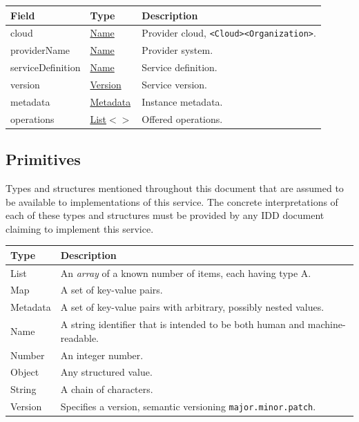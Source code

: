 \documentclass[a4paper]{arrowhead}
\newcommand{\pdef}[1]{{\textcolor{ArrowheadGrey}{#1\label{sec:model:primitives:#1}\label{sec:model:primitives:#1s}\label{sec:model:primitives:#1es}}}}
\newcommand{\pref}[1]{{\textcolor{ArrowheadGrey}{\hyperref[sec:model:primitives:#1]{#1}}}}
\begin{document}
\noindent\begin{tabularx}{\textwidth}{| >{\raggedright\arraybackslash}p{3.9cm} | >{\raggedright\arraybackslash\small}p{5.3cm} | X |} \hline
\rowcolor{gray!33} Field & Type & Description \\ \hline
cloud & \pref{Name} & Provider cloud, \texttt{\textless{}Cloud\textgreater{}\textbar{}\allowbreak{}\textless{}Organization\textgreater{}}. \\ \hline
provider\allowbreak{}Name & \pref{Name} & Provider system. \\ \hline
service\allowbreak{}Definition & \pref{Name} & Service definition. \\ \hline
version & \pref{Version} & Service version. \\ \hline
metadata & \pref{Metadata} & Instance metadata. \\ \hline
operations & \pref{List}$<$\allowbreak{}\pref{String}$>$ & Offered operations. \\ \hline
\end{tabularx}



\subsection{Primitives}
\label{sec:model:primitives}

Types and structures mentioned throughout this document that are assumed to be available to implementations of this service.
The concrete interpretations of each of these types and structures must be provided by any IDD document claiming to implement this service.

\noindent\begin{tabularx}{\textwidth}{| p{4.6cm} | X |} \hline
\rowcolor{gray!33} Type & Description \\ \hline
\pdef{List} & An \textit{array} of a known number of items, each having type A. \\ \hline
\pdef{Map} & A set of key-value pairs. \\ \hline
\pdef{Metadata} & A set of key-value pairs with arbitrary, possibly nested values. \\ \hline
\pdef{Name} & A string identifier that is intended to be both human and machine-readable. \\ \hline
\pdef{Number} & An integer number. \\ \hline
\pdef{Object} & Any structured value. \\ \hline
\pdef{String} & A chain of characters. \\ \hline
\pdef{Version} & Specifies a version, semantic versioning \texttt{major.minor.patch}. \\ \hline
\end{tabularx}
\end{document}
